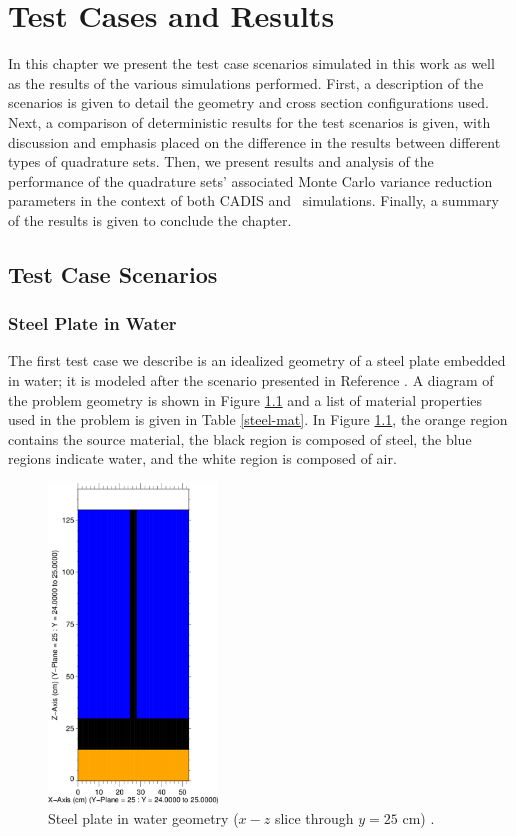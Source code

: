 \chapter{Test Cases and Results}
\label{sec:results}

In this chapter we present the test case scenarios simulated in this work as well as
the results of the various simulations performed. First, a description of the 
scenarios is given to detail the geometry and cross section configurations used. 
Next, a comparison of deterministic results for the test scenarios is given, with 
discussion and emphasis placed on the difference in the results between different 
types of quadrature sets. Then, we present results and analysis of the performance of
the quadrature sets' associated Monte Carlo variance reduction parameters in the
context of both CADIS and \fwc\ simulations. Finally, a summary of the results is
given to conclude the chapter.

\section{Test Case Scenarios}

\subsection{Steel Plate in Water}
\label{sec:steel_params}

The first test case we describe is an idealized geometry of a steel plate embedded in
water; it is modeled after the scenario presented in Reference 
\cite{wilsonslaybaugh}. 
A diagram of the problem geometry is shown in Figure \ref{steelxz} and a list
of material properties used in the problem is given in Table \ref{steel-mat}.
In Figure \ref{steelxz}, the orange region contains the source material, the black
region is composed of steel, the blue regions indicate water, and the white region is
composed of air.

\begin{figure}[!htb]
\centering
\includegraphics[width=0.4\textwidth]{img/steel-xz.png}
\caption{Steel plate in water geometry ($x-z$ slice through $y = 25$ cm) 
         \cite{wilsonslaybaugh}.}
\label{steelxz}
\end{figure}

